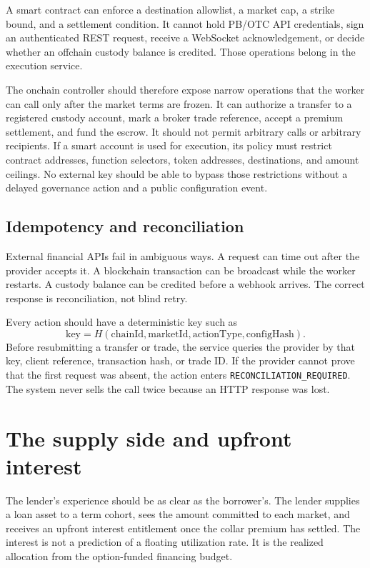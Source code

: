 \documentclass[11pt,oneside]{article}
\begin{document}
A smart contract can enforce a destination allowlist, a market cap, a strike bound, and a settlement condition. It cannot hold PB/OTC API credentials, sign an authenticated REST request, receive a WebSocket acknowledgement, or decide whether an offchain custody balance is credited. Those operations belong in the execution service.

The onchain controller should therefore expose narrow operations that the worker can call only after the market terms are frozen. It can authorize a transfer to a registered custody account, mark a broker trade reference, accept a premium settlement, and fund the escrow. It should not permit arbitrary calls or arbitrary recipients. If a smart account is used for execution, its policy must restrict contract addresses, function selectors, token addresses, destinations, and amount ceilings. No external key should be able to bypass those restrictions without a delayed governance action and a public configuration event.

\subsection{Idempotency and reconciliation}

External financial APIs fail in ambiguous ways. A request can time out after the provider accepts it. A blockchain transaction can be broadcast while the worker restarts. A custody balance can be credited before a webhook arrives. The correct response is reconciliation, not blind retry.

Every action should have a deterministic key such as
\[
\mathrm{key}=H(\mathrm{chainId},\mathrm{marketId},\mathrm{actionType},\mathrm{configHash}).
\]
Before resubmitting a transfer or trade, the service queries the provider by that key, client reference, transaction hash, or trade ID. If the provider cannot prove that the first request was absent, the action enters \texttt{RECONCILIATION\_REQUIRED}. The system never sells the call twice because an HTTP response was lost.

\section{The supply side and upfront interest}

The lender's experience should be as clear as the borrower's. The lender supplies a loan asset to a term cohort, sees the amount committed to each market, and receives an upfront interest entitlement once the collar premium has settled. The interest is not a prediction of a floating utilization rate. It is the realized allocation from the option-funded financing budget.
\end{document}

